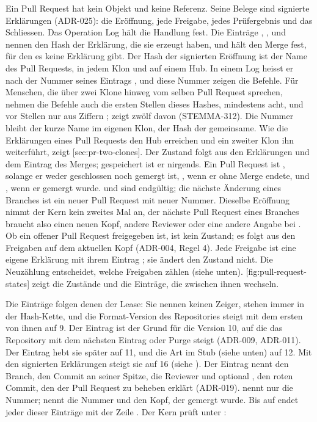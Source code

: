 Ein Pull Request hat kein Objekt und keine Referenz.
Seine Belege sind signierte Erklärungen (ADR-025): die Eröffnung, jede Freigabe, jedes
Prüfergebnis und das Schliessen.
Das Operation Log hält die Handlung fest.
Die Einträge , ,  und  nennen den Hash
der Erklärung, die sie erzeugt haben, und  hält den Merge fest, für den es keine
Erklärung gibt.
Der Hash der signierten Eröffnung ist der Name des Pull Requests, in jedem Klon und auf einem Hub.
In einem Log heisst er nach der Nummer seines Eintrags , und diese Nummer zeigen
die Befehle.
Für Menschen, die über zwei Klone hinweg vom selben Pull Request sprechen, nehmen die Befehle
auch die ersten Stellen dieses Hashes, mindestens acht, und vor Stellen nur aus Ziffern
;  zeigt zwölf davon (STEMMA-312). Die Nummer bleibt der kurze Name im
eigenen Klon, der Hash der gemeinsame.
Wie die Erklärungen eines Pull Requests den Hub erreichen und ein zweiter Klon ihn weiterführt,
zeigt [sec:pr-two-clones].
Der Zustand folgt aus den Erklärungen und dem Eintrag des Merges; gespeichert ist er nirgends.
Ein Pull Request ist , solange er weder geschlossen noch gemergt ist,
, wenn er ohne Merge endete, und , wenn er gemergt wurde.
 und  sind endgültig; die nächste Änderung eines Branches ist ein neuer
Pull Request mit neuer Nummer.
Dieselbe Eröffnung nimmt der Kern kein zweites Mal an, der nächste Pull Request eines Branches
braucht also einen neuen Kopf, andere Reviewer oder eine andere Angabe bei .
Ob ein offener Pull Request freigegeben ist, ist kein Zustand; es folgt aus den Freigaben
auf dem aktuellen Kopf (ADR-004, Regel 4).
Jede Freigabe ist eine eigene Erklärung mit ihrem Eintrag ; sie ändert den
Zustand nicht.
Die Neuzählung entscheidet, welche Freigaben zählen (siehe unten).
[fig:pull-request-states] zeigt die Zustände und die Einträge, die zwischen
ihnen wechseln.

\startplacefigure[title={Zustände eines Pull Requests},
    reference=fig:pull-request-states,location=here]
\stopplacefigure

Die Einträge folgen denen der Lease: Sie nennen keinen Zeiger, stehen immer in der Hash-Kette,
und die Format-Version des Repositories steigt mit dem ersten von ihnen auf 9. Der Eintrag
 ist der Grund für die Version 10, auf die das Repository mit dem nächsten
Eintrag oder Purge steigt (ADR-009, ADR-011).
Der Eintrag  hebt sie später auf 11,
und die Art im Stub (siehe unten) auf 12.
Mit den signierten Erklärungen steigt sie auf 16 (siehe ).
Der Eintrag  nennt den Branch, den Commit an seiner Spitze, die Reviewer und
optional , den roten Commit, den der Pull Request zu beheben erklärt
(ADR-019).
 nennt nur die Nummer;  nennt die Nummer und den Kopf, der
gemergt wurde.
Bis auf  endet jeder dieser Einträge mit der Zeile .
Der Kern prüft unter :

